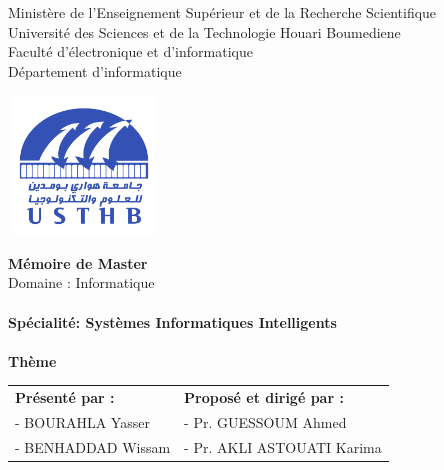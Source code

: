 \documentclass[12pt , a4paper]{report}
\begin{document}
	\begin{center}
		\normalsize{Ministère de l'Enseignement Supérieur et de la Recherche Scientifique}\\
		\normalsize{Université des Sciences et de la Technologie Houari Boumediene}\\
		\normalsize{Faculté d'électronique et d'informatique}\\
		\normalsize{Département d'informatique}\\
	\end{center}
	\begin{center}
		\includegraphics[width=4cm,height=3.7cm]{usthb.png}
	\end{center}
	
	
	\begin{center}
		\Huge{\textbf{Mémoire de Master}}\\
		\large{Domaine : Informatique}\\
		\textbf{}\\
		\large{\textbf{Spécialité: Systèmes Informatiques Intelligents}}\\
		\textbf{}\\
		\bigskip
		\vspace*{1cm}
		\normalsize{\textbf{Thème}}
	\end{center}
	\vspace*{1.5cm}
	
	\begin{table}[h]
		\center
		\begin{tabular}{p{8cm}p{6.5cm}}
			\textbf{Présenté par :} & \textbf{Proposé et dirigé par :}\\
			- BOURAHLA Yasser  & -	Pr. GUESSOUM Ahmed\\
			- BENHADDAD Wissam  & -	Pr. AKLI ASTOUATI Karima\\
		\end{tabular}
	\end{table}
	
\end{document}
